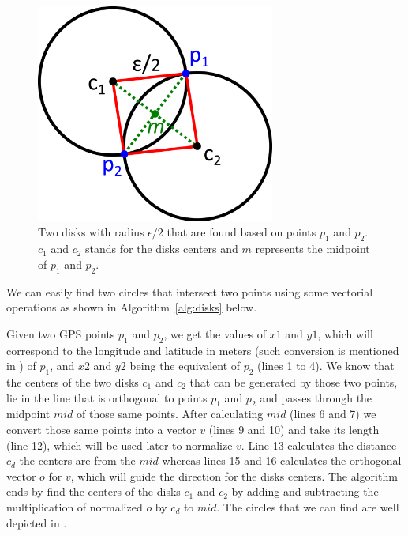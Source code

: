 \begin{figure}[h!]
    \centering
    \includegraphics[width=0.7\textwidth]{images/disks_discovery.png}
    \caption{Two disks with radius $\epsilon/2$ that are found based on points $p_1$ and $p_2$. $c_1$ and $c_2$ stands
        for the disks centers and $m$ represents the midpoint of $p_1$ and $p_2$.}
    \label{fig:disks_discovery}
\end{figure}

We can easily find two circles that intersect two points using some vectorial operations as shown in
Algorithm~\ref{alg:disks} below.

Given two GPS points $p_1$ and $p_2$, we get the values of $x1$ and $y1$, which will correspond to the longitude and
latitude in meters (such conversion is mentioned in ) of $p_1$, and $x2$ and $y2$ being the
equivalent of $p_2$ (lines 1 to 4). We know that the centers of the two disks $c_1$ and $c_2$ that can be generated by
those two points, lie in the line that is orthogonal to points $p_1$ and $p_2$ and passes through the midpoint $mid$ of
those same points. After calculating $mid$ (lines 6 and 7) we convert those same points into a vector $v$ (lines 9 and
10) and take its length (line 12), which will be used later to normalize $v$. Line 13 calculates the distance $c_d$ the
centers are from the $mid$ whereas lines 15 and 16 calculates the orthogonal vector $o$ for $v$, which will guide the
direction for the disks centers. The algorithm ends by find the centers of the disks $c_1$ and $c_2$ by adding and
subtracting the multiplication of normalized $o$ by $c_d$ to $mid$. The circles that we can find are well depicted in
.

